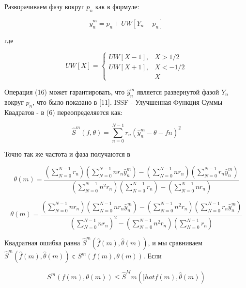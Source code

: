 Разворачиваем фазу вокруг $p_n$ как в формуле:

\begin{equation}
\label{eq:equation1.55}	
	\hat{y}^m_n =p_n +UW[Y_n-p_n]
\end{equation}

где

\begin{equation}
\label{eq:equation1.56}	
	UW[X] = \left\{ \begin{array}{ll}
		UW[X-1], & \textrm{$X>1/2$}\\
		UW[X+1], & \textrm{$X<-1/2$}\\
		& \textrm{$X$}
	\end{array} \right.
\end{equation}



Операция (16) может гарантировать, что $\hat{y}^m_n$ является развернутой фазой $Y_n$ вокруг $p_n$, что было показано в [11]. ISSF - Улучшенная Функция Суммы Квадратов - в (6) переопределяется как:


\begin{equation}
\label{eq:equation1.57}
	\hat{S}^m(f,\theta) =\sum^{N-1}_{n=0} r_n(\hat{y}^m_n - \theta-fn)^2
\end{equation}

Точно так же частота и фаза получаются в

\begin{equation}
\label{eq:equation1.58}
	\theta(m) = \frac{(\sum^{N-1}_{N=0}r_n) (\sum^{N-1}_{N=0}n r_n \hat{y}^m_n)- (\sum^{N-1}_{N=0}n r_n)(\sum^{N-1}_{N=0}r_n \hat{y}^m_n) }                     {(\sum^{N-1}_{N=0}n^2 r_n) (\sum^{N-1}_{N=0}r_n)-(\sum^{N-1}_{N=0}nr_n)}
\end{equation}

\begin{equation}
\label{eq:equation1.59}
	\theta(m) = \frac{(\sum^{N-1}_{N=0}n r_n) (\sum^{N-1}_{N=0}n r_n \hat{y}^m_n)- (\sum^{N-1}_{N=0}n^2 r_n)(\sum^{N-1}_{N=0}r_n \hat{y}^m_n) }                           {(\sum^{N-1}_{N=0}n r_n)^2 - (\sum^{N-1}_{N=0}n^2 r_n)(\sum^{N-1}_{N=0}r_n)}
\end{equation}

Квадратная ошибка равна $\hat{S}^m (\hat{f}(m), \hat{\theta}(m))$, и мы сравниваем $\hat{S}^m (\hat{f}(m),\hat{\theta}(m))$ с $S^m (f (m), \theta(m))$. Если

\begin{equation}
\label{eq:equation1.60}
	S^m(f(m),\theta(m))\leq \hat{S}^Mm (]hat{f}(m),\hat{\theta}(m))
\end{equation}

